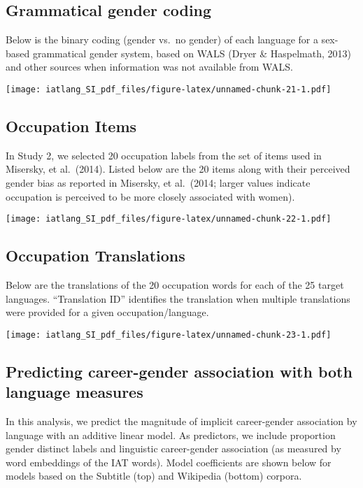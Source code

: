 \documentclass[]{article}
\begin{document}
\hypertarget{grammatical-gender-coding}{%
\subsection{Grammatical gender coding}\label{grammatical-gender-coding}}

Below is the binary coding (gender vs.~no gender) of each language for a
sex-based grammatical gender system, based on WALS (Dryer \& Haspelmath,
2013) and other sources when information was not available from WALS.

\texttt{[image: iatlang\_SI\_pdf\_files/figure-latex/unnamed-chunk-21-1.pdf]}

\hypertarget{occupation-items}{%
\subsection{Occupation Items}\label{occupation-items}}

In Study 2, we selected 20 occupation labels from the set of items used
in Misersky, et al.~(2014). Listed below are the 20 items along with
their perceived gender bias as reported in Misersky, et al.~(2014;
larger values indicate occupation is perceived to be more closely
associated with women).

\texttt{[image: iatlang\_SI\_pdf\_files/figure-latex/unnamed-chunk-22-1.pdf]}

\hypertarget{occupation-translations}{%
\subsection{Occupation Translations}\label{occupation-translations}}

Below are the translations of the 20 occupation words for each of the 25
target languages. ``Translation ID'' identifies the translation when
multiple translations were provided for a given occupation/language.

\texttt{[image: iatlang\_SI\_pdf\_files/figure-latex/unnamed-chunk-23-1.pdf]}

\hypertarget{predicting-career-gender-association-with-both-language-measures}{%
\subsection{Predicting career-gender association with both language
measures}\label{predicting-career-gender-association-with-both-language-measures}}

In this analysis, we predict the magnitude of implicit career-gender
association by language with an additive linear model. As predictors, we
include proportion gender distinct labels and linguistic career-gender
association (as measured by word embeddings of the IAT words). Model
coefficients are shown below for models based on the Subtitle (top) and
Wikipedia (bottom) corpora.
\end{document}
